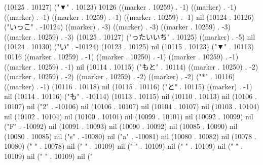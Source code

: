 (10125 . 10127) ("▼" . 10123) 10126 ((marker . 10259) . -1) ((marker) . -1) ((marker) . -1) ((marker . 10259) . -1) ((marker . 10259) . -1) nil (10124 . 10126) ("いっこ" . -10124) ((marker) . -3) ((marker) . -3) ((marker . 10259) . -3) ((marker . 10259) . -3) (10125 . 10127) ("ったいいち" . 10125) ((marker) . -5) nil (10124 . 10130) ("い" . -10124) (10123 . 10125) nil (10115 . 10123) ("▼" . 10113) 10116 ((marker . 10259) . -1) ((marker . 10250) . -1) ((marker . 10259) . -1) ((marker . 10259) . -1) nil (10114 . 10115) ("もと" . 10114) ((marker . 10250) . -2) ((marker . 10259) . -2) ((marker . 10259) . -2) ((marker) . -2) ("*" . 10116) ((marker) . -1) (10116 . 10118) nil (10115 . 10116) ("と" . 10115) ((marker) . -1) nil (10114 . 10116) ("も" . -10114) (10113 . 10115) nil (10110 . 10113) nil (10106 . 10107) nil ("2" . -10106) nil (10106 . 10107) nil (10104 . 10107) nil (10103 . 10104) nil (10102 . 10104) nil (10100 . 10101) nil (10099 . 10101) nil (10092 . 10099) nil ("F" . -10092) nil (10091 . 10093) nil (10090 . 10092) nil (10085 . 10090) nil (10080 . 10085) nil ("s" . -10080) nil ("a" . -10081) nil (10080 . 10082) nil (10078 . 10080) (" " . 10078) nil ("
" . 10109) nil ("
" . 10109) nil ("
" . 10109) nil ("
" . 10109) nil ("
" . 10109) nil ("
